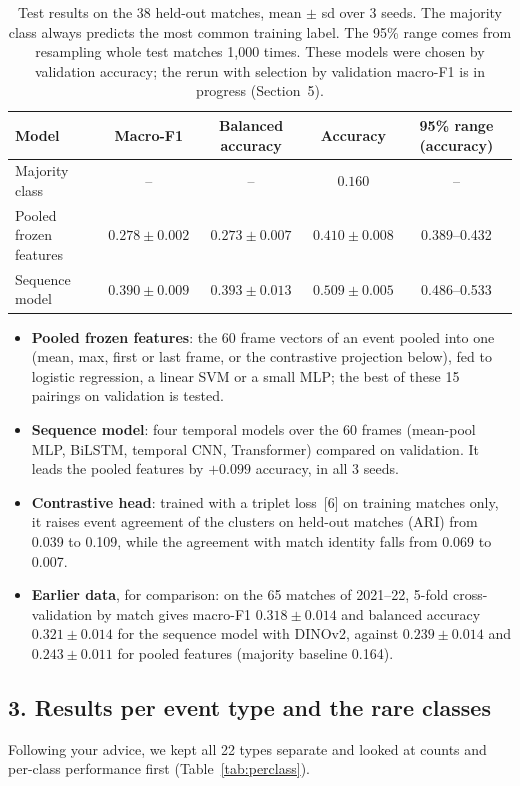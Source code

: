 \documentclass[11pt]{article}
\begin{document}
\begin{table}[h]
\centering\small
\begin{tabular}{lcccc}
\toprule
Model & Macro-F1 & Balanced accuracy & Accuracy & 95\% range (accuracy)\\
\midrule
Majority class & -- & -- & $0.160$ & --\\
Pooled frozen features & $0.278 \pm 0.002$ & $0.273 \pm 0.007$ & $0.410 \pm 0.008$ & 0.389--0.432\\
Sequence model & $\mathbf{0.390 \pm 0.009}$ & $\mathbf{0.393 \pm 0.013}$ & $\mathbf{0.509 \pm 0.005}$ & 0.486--0.533\\
\bottomrule
\end{tabular}
\caption{Test results on the 38 held-out matches, mean $\pm$ sd over 3 seeds. The majority class always predicts
the most common training label. The 95\% range comes from resampling whole test matches 1,000 times. These models were chosen by validation accuracy; the rerun with
selection by validation macro-F1 is in progress (Section~5).}
\label{tab:results}
\end{table}

\begin{itemize}[noitemsep]
  \item \textbf{Pooled frozen features}: the 60 frame vectors of an event pooled into one (mean, max, first or
        last frame, or the contrastive projection below), fed to logistic regression, a linear SVM or a small
        MLP; the best of these 15 pairings on validation is tested.
  \item \textbf{Sequence model}: four temporal models over the 60 frames (mean-pool MLP, BiLSTM, temporal CNN,
        Transformer) compared on validation. It leads the pooled features by $+0.099$ accuracy, in all 3 seeds.
  \item \textbf{Contrastive head}: trained with a triplet loss~[6] on training matches only, it raises event
        agreement of the clusters on held-out matches (ARI) from 0.039 to 0.109, while the agreement with match
        identity falls from 0.069 to 0.007.
  \item \textbf{Earlier data}, for comparison: on the 65 matches of 2021--22, 5-fold cross-validation by match
        gives macro-F1 $0.318 \pm 0.014$ and balanced accuracy $0.321 \pm 0.014$ for the sequence model with
        DINOv2, against $0.239 \pm 0.014$ and $0.243 \pm 0.011$ for pooled features (majority baseline 0.164).
\end{itemize}

\subsection*{3. Results per event type and the rare classes}
Following your advice, we kept all 22 types separate and looked at counts and per-class performance first
(Table~\ref{tab:perclass}).
\end{document}
